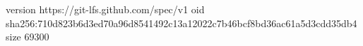 version https://git-lfs.github.com/spec/v1
oid sha256:710d823b6d3ed70a96d8541492c13a12022c7b46bcf8bd36ac61a5d3cdd35db4
size 69300
